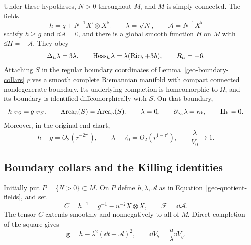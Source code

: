 \begin{theorem}
\label{geo-static-quotient}
\label{geo-static-reduction}
Under these hypotheses, $N>0$ throughout $M$, and $M$ is simply connected.
The fields
\begin{equation}
 h=g+N^{-1}X^\flat\otimes X^\flat,
 \qquad \lambda=\sqrt N,\qquad \mathcal A=N^{-1}X^\flat
 \label{geo-quotient-fields}
\end{equation}
satisfy $h\geq g$ and $\dd\mathcal A=0$, and there is a global smooth
function $H$ on $M$
with $\dd H=-\mathcal A$.  They obey
\begin{equation}
 \Delta_h\lambda=3\lambda,
 \qquad \operatorname{Hess}_h\lambda=\lambda(\operatorname{Ric}_h+3h),
 \qquad R_h=-6.
 \label{geo-static-equations}
\end{equation}
Attaching $S$ in the regular boundary coordinates of
Lemma~\ref{geo-boundary-collars} gives a smooth complete Riemannian manifold
with compact connected nondegenerate boundary.  Its underlying completion is homeomorphic to
$\Omega$, and its boundary is identified diffeomorphically with $S$.  On that
boundary,
\begin{equation}
 h|_{TS}=g|_{TS},\qquad \operatorname{Area}_h(S)=\operatorname{Area}_g(S),\qquad \lambda=0,
 \qquad \partial_{\nu_h}\lambda=\kappa_h,
 \qquad \mathrm{II}_h=0.
 \label{geo-quotient-boundary}
\end{equation}
Moreover, in the original end chart,
\begin{equation}
 h-g=O_2(r^{-2\tau'}),\qquad
 \lambda-V_0=O_2(r^{1-\tau'}),\qquad \frac{\lambda}{V_0}\longrightarrow1.
 \label{geo-quotient-end}
\end{equation}
\end{theorem}

\subsection{Boundary collars and the Killing identities}

Initially put $P=\{N>0\}\subset M$.  On $P$ define $h,\lambda,\mathcal A$ as
in Equation~\eqref{geo-quotient-fields}, and set
\begin{equation}
 C=h^{-1}=g^{-1}-u^{-2}X\otimes X,
 \qquad \mathcal F=\dd\mathcal A.
 \label{geo-C-F}
\end{equation}
The tensor $C$ extends smoothly and nonnegatively to all of $M$.  Direct
completion of the square gives
\begin{equation}
 \mathbf g=h-\lambda^2(\dd t-\mathcal A)^2,
 \qquad \dd V_h=\frac{u}{\lambda}\dd V_g.
 \label{geo-square-completion}
\end{equation}

